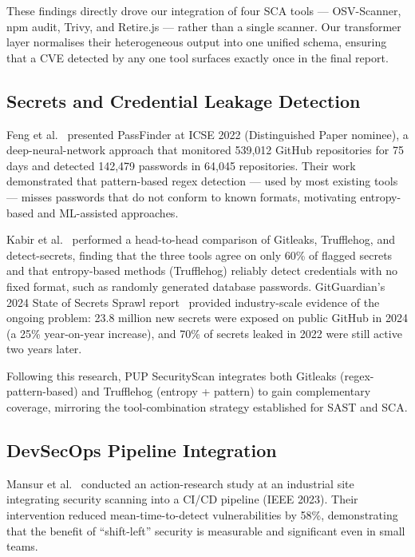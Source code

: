 \documentclass[12pt,a4paper]{report}
\begin{document}
These findings directly drove our integration of four SCA tools --- OSV-Scanner, npm audit, Trivy, and Retire.js --- rather than a single scanner. Our transformer layer normalises their heterogeneous output into one unified schema, ensuring that a CVE detected by any one tool surfaces exactly once in the final report.

\subsection{Secrets and Credential Leakage Detection}

Feng et al.~\cite{feng2022} presented PassFinder at ICSE 2022 (Distinguished Paper nominee), a deep-neural-network approach that monitored 539,012 GitHub repositories for 75 days and detected 142,479 passwords in 64,045 repositories. Their work demonstrated that pattern-based regex detection --- used by most existing tools --- misses passwords that do not conform to known formats, motivating entropy-based and ML-assisted approaches.

Kabir et al.~\cite{kabir2023} performed a head-to-head comparison of Gitleaks, Trufflehog, and detect-secrets, finding that the three tools agree on only 60\% of flagged secrets and that entropy-based methods (Trufflehog) reliably detect credentials with no fixed format, such as randomly generated database passwords. GitGuardian's 2024 State of Secrets Sprawl report~\cite{gitguardian2024} provided industry-scale evidence of the ongoing problem: 23.8 million new secrets were exposed on public GitHub in 2024 (a 25\% year-on-year increase), and 70\% of secrets leaked in 2022 were still active two years later.

Following this research, PUP SecurityScan integrates both Gitleaks (regex-pattern-based) and Trufflehog (entropy + pattern) to gain complementary coverage, mirroring the tool-combination strategy established for SAST and SCA.

\subsection{DevSecOps Pipeline Integration}

Mansur et al.~\cite{mansur2023} conducted an action-research study at an industrial site integrating security scanning into a CI/CD pipeline (IEEE 2023). Their intervention reduced mean-time-to-detect vulnerabilities by 58\%, demonstrating that the benefit of ``shift-left'' security is measurable and significant even in small teams.
\end{document}
